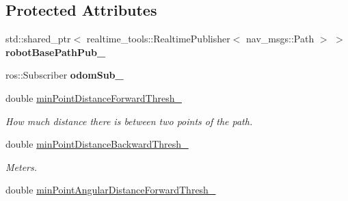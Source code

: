 \subsection*{Protected Attributes}
\begin{DoxyCompactItemize}
\item 
std\+::shared\+\_\+ptr$<$ realtime\+\_\+tools\+::\+Realtime\+Publisher$<$ nav\+\_\+msgs\+::\+Path $>$ $>$ {\bfseries robot\+Base\+Path\+Pub\+\_\+}\hypertarget{classsmacc__odom__tracker_1_1OdomTracker_a32d060919f2630e0695ce016c0563a3f}{}\label{classsmacc__odom__tracker_1_1OdomTracker_a32d060919f2630e0695ce016c0563a3f}

\item 
ros\+::\+Subscriber {\bfseries odom\+Sub\+\_\+}\hypertarget{classsmacc__odom__tracker_1_1OdomTracker_a901bd60f4c1d21537a160d034ff504ef}{}\label{classsmacc__odom__tracker_1_1OdomTracker_a901bd60f4c1d21537a160d034ff504ef}

\item 
double \hyperlink{classsmacc__odom__tracker_1_1OdomTracker_a0017d7740d99c2cc8ba946495b96ce41}{min\+Point\+Distance\+Forward\+Thresh\+\_\+}\hypertarget{classsmacc__odom__tracker_1_1OdomTracker_a0017d7740d99c2cc8ba946495b96ce41}{}\label{classsmacc__odom__tracker_1_1OdomTracker_a0017d7740d99c2cc8ba946495b96ce41}

\begin{DoxyCompactList}\small\item\em How much distance there is between two points of the path. \end{DoxyCompactList}\item 
double \hyperlink{classsmacc__odom__tracker_1_1OdomTracker_a79d94520c5da1852602aaf264377a82f}{min\+Point\+Distance\+Backward\+Thresh\+\_\+}\hypertarget{classsmacc__odom__tracker_1_1OdomTracker_a79d94520c5da1852602aaf264377a82f}{}\label{classsmacc__odom__tracker_1_1OdomTracker_a79d94520c5da1852602aaf264377a82f}

\begin{DoxyCompactList}\small\item\em Meters. \end{DoxyCompactList}\item 
double \hyperlink{classsmacc__odom__tracker_1_1OdomTracker_a1611f6e11f48e8c2bdf6d16adf35fa2a}{min\+Point\+Angular\+Distance\+Forward\+Thresh\+\_\+}\hypertarget{classsmacc__odom__tracker_1_1OdomTracker_a1611f6e11f48e8c2bdf6d16adf35fa2a}{}\label{classsmacc__odom__tracker_1_1OdomTracker_a1611f6e11f48e8c2bdf6d16adf35fa2a}


\end{DoxyCompactItemize}
